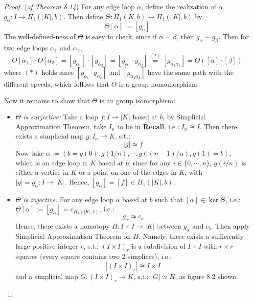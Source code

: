 \begin{proof}
    (\textit{of Theorem 8.14})
    For any edge loop $\alpha$, define the realization of $\alpha$, $g_\alpha: I \to \Pi_1 (|K|,b)$. Then define $\Theta: \Pi_1 (K,b) \to \Pi_1 (|K|,b)$ by
        $$\Theta [\alpha] := [g_\alpha]$$
    The well-defined-ness of $\Theta$ is easy to check, since if $\alpha \sim \beta$, then $g_\alpha \sim g_\beta$. Then for two edge loops $\alpha_1$ and $\alpha_2$, 
    $$\Theta [\alpha_1] \cdot \Theta [\alpha_2] = [g_{\alpha_1}] \cdot [g_{\alpha_2}] = [g_{\alpha_1} \cdot g_{\alpha_2}] \overset{(*)}{=}[g_{\alpha_1 \alpha_2}] = \Theta ([\alpha] \cdot [\beta])$$
    where $(*)$ holds since $[g_{\alpha_1} \cdot g_{\alpha_2}]$ and $[g_{\alpha_1 \alpha_2}]$ have the same path with the different speeds, which follows that $\Theta$ is a group homomorphism.

    Now it remains to show that $\Theta$ is an group isomorphism:
    \begin{itemize}
        \item \textit{$\Theta$ is surjective:} Take a loop $f:I \to |K|$ based at $b$, by Simplicial Approximation Theorem, take $I_n$ to be in \textbf{Recall}, i.e.: $I_n \cong I$. Then there exists a simplicial map $g: I_n \to K$, s.t.:
        $$|g| \simeq f$$
        Now take $\alpha := (b=g(0), g(1/n), \cdots ,g((n-1)/n), g(1) =b)$, which is an edge loop in $K$ based at $b$, since for any $i \in \{ 0,\cdots,n\}$, $g(i/n)$ is either a vertice in $K$ or a point on one of the edges in $K$, with $|g| = g_\alpha : I \to |K|$. Hence, $[g_\alpha] = [f] \in \Pi_1 (|K|,b)$.
        \item \textit{$\Theta$ is injective:} For any edge loop $\alpha$ based at $b$ such that $[\alpha] \in \ker \Theta$, i.e.: $\Theta [\alpha] := [g_\alpha] = e_{\Pi_1 (|K|,b)}$, i.e.:
        $$g _ \alpha \simeq c_b$$
        Hence, there exists a homotopy $H:I \times I \to |K|$ between $g_\alpha$ and $c_b$. Then apply Simplicial Approximation Theorem on $H$. Namely, there exists a sufficiently large positive integer $r$, s.t.: $(I \times I)_r$ is a subdivision of $I \times I$ with $r \times r$ squares (every square contains two 2-simplices), i.e.:
        $$|(I \times I)_r| \cong I \times I$$
        and a simplicial map $G : (I \times I)_r \to K$, s.t.: $|G| \simeq H$, as figure 8.2 shown.
        \begin{figure}[htbp]
            \centering
            \begin{tikzpicture}[scale=1.2, thick]
        

\end{tikzpicture}
\end{figure}
\end{itemize}
\end{proof}
